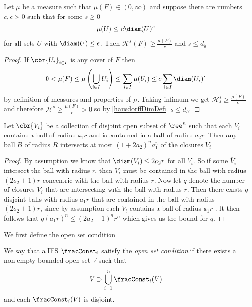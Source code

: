 \begin{lemma}\label{massDistribution}
	Let $\mu$ be a measure such that $\mu(F) \in (0, \infty)$ and suppose there are numbers $c, \epsilon > 0$ such that for some $s \geq 0$
	\begin{equation}
		\mu(U) \leq c \diam(U)^{s}
	\end{equation}
	for all sets $U$ with $\diam(U) \leq \epsilon$. Then $\mathcal{H}^{s}(F) \geq \frac{\mu(F)}{c}$ and $s \leq d_h$
\end{lemma}
\begin{proof}
	If $\cbr{U_i}_{i \in I}$ is any cover of $F$ then
	\begin{equation}
		0 < \mu(F) \leq \mu \left(\bigcup_{i \in I} U_i\right) \leq \sum_{i \in I} \mu(U_i) \leq c \sum_{i \in I} \diam(U_i)^{s}
	\end{equation}
	by definition of measures and properties of $\mu$. Taking infimum we get $\mathcal{H}^{s}_{\delta} \geq \frac{\mu(F)}{c}$ and therefore $\mathcal{H}^{s} \geq \frac{\mu(F)}{c} > 0$ so by \cref{hausdorffDimDefi} $s \leq d_h$.
\end{proof}

\begin{lemma}\label{theConstq}
	Let $\cbr{V_i}$ be a collection of disjoint open subset of $\ree^{n}$ such that each $V_i$ contains a ball of radius $a_1r$ and is contained in a ball of radius $a_2r$. Then any ball $B$ of radius $R$ intersects at most $(1+2a_2)^{n}a_{1}^{n}$ of the closures $\overline{V}_i$
\end{lemma}
\begin{proof}
	By assumption we know that $\diam(V_i) \leq 2a_2 r$ for all $V_i$. So if some $\overline{V}_i$ intersect the ball with radius $r$, then $\overline{V}_i$ must be contained in the ball with radius $(2a_2 + 1)r$ concentric with the ball with radius $r$.  Now let $q$ denote the number of closures $\overline{V}_i$ that are intersecting with the ball with radius $r$. Then there exists $q$ disjoint balls with radius $a_1r$ that are contained in the ball with radius $(2a_2 +1)r$, since by assumption each $\overline{V}_i$ contains a ball of radius $a_1r$ . It then follows that $q(a_1r)^{n} \leq (2a_2 +1)^{n}r^{n}$ which gives us the bound for $q$.
\end{proof}

We first define the open set condition
\begin{defi}\label{OpenSetCondition}
	We say that a IFS $\fracConst_i$ satisfy the \emph{open set condition} if there exists a non-empty bounded open set $V$ such that
	\begin{equation}
		V \supset \bigcup_{i = 1}^{5} \fracConst_i(V)
	\end{equation}
	and each $\fracConst_{i}(V)$ is disjoint.
\end{defi}


